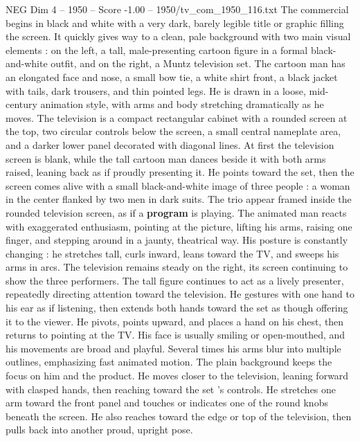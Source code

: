 \begin{textsample}{NEG Dim 4 – 1950 – Score -1.00 – 1950/tv\_com\_1950\_116.txt}  \label{ex:f4_neg_064}
The commercial begins in black and white with a very dark, barely legible title or graphic filling the screen.
It quickly gives way to a clean, pale background with two main visual elements : on the left, a tall, male-presenting cartoon figure in a formal black-and-white outfit, and on the right, a Muntz television set.
The cartoon man has an elongated face and nose, a small bow tie, a white shirt front, a black jacket with tails, dark trousers, and thin pointed legs.
He is drawn in a loose, mid-century animation style, with arms and body stretching dramatically as he moves.
The television is a compact rectangular cabinet with a rounded screen at the top, two circular controls below the screen, a small central nameplate area, and a darker lower panel decorated with diagonal lines.
At first the television screen is blank, while the tall cartoon man dances beside it with both arms raised, leaning back as if proudly presenting it.
He points toward the set, then the screen comes alive with a small black-and-white image of three people : a woman in the center flanked by two men in dark suits.
The trio appear framed inside the rounded television screen, as if a \textbf{program} is playing.
The animated man reacts with exaggerated enthusiasm, pointing at the picture, lifting his arms, raising one finger, and stepping around in a jaunty, theatrical way.
His posture is constantly changing : he stretches tall, curls inward, leans toward the TV, and sweeps his arms in arcs.
The television remains steady on the right, its screen continuing to show the three performers.
The tall figure continues to act as a lively presenter, repeatedly directing attention toward the television.
He gestures with one hand to his ear as if listening, then extends both hands toward the set as though offering it to the viewer.
He pivots, points upward, and places a hand on his chest, then returns to pointing at the TV.
His face is usually smiling or open-mouthed, and his movements are broad and playful.
Several times his arms blur into multiple outlines, emphasizing fast animated motion.
The plain background keeps the focus on him and the product.
He moves closer to the television, leaning forward with clasped hands, then reaching toward the set ’s controls.
He stretches one arm toward the front panel and touches or indicates one of the round knobs beneath the screen.
He also reaches toward the edge or top of the television, then pulls back into another proud, upright pose.

\end{textsample}
